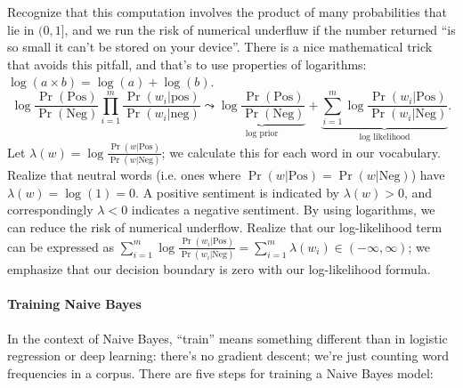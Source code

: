 \documentclass[12pt]{article}
\begin{document}
Recognize that this computation involves the product of many probabilities that lie in $(0,1]$, and we run the risk of numerical underfluw if the number returned ``is so small it can't be stored on your device''. There is a nice mathematical trick that avoids this pitfall, and that's to use properties of logarithms: $\log(a \times b) = \log (a) + \log (b)$.
\[
\log  \frac{\Pr(\textrm{Pos})}{\Pr(\textrm{Neg})} \prod_{i=1}^{m} \frac{\Pr(w_i | \textrm{pos})}{\Pr(w_i|\textrm{neg})}  \leadsto \underbrace{\log \frac{\Pr(\textrm{Pos})}{\Pr(\textrm{Neg})}}_{\textrm{log prior}} + \underbrace{\sum_{i=1}^{m} \log \frac{\Pr(w_i | \textrm{Pos})}{\Pr(w_i | \textrm{Neg})}}_{\textrm{log likelihood}}.
\]
Let $\lambda(w) = \log \frac{\Pr(w | \textrm{Pos})}{\Pr(w | \textrm{Neg})}$; we calculate this for each word in our vocabulary. Realize that neutral words (i.e. ones where $\Pr(w | \textrm{Pos}) = \Pr(w | \textrm{Neg})$) have $\lambda(w) = \log(1) = 0$. A positive sentiment is indicated by $\lambda(w) > 0$, and correspondingly $\lambda < 0$ indicates a negative sentiment. By using logarithms, we can reduce the risk of numerical underflow.
Realize that our log-likelihood term can be expressed as $\sum_{i=1}^{m} \log \frac{\Pr(w_i | \textrm{Pos})}{\Pr(w_i | \textrm{Neg})} = \sum_{i=1}^m \lambda(w_i) \in (-\infty, \infty)$; we emphasize that our decision boundary is zero with our log-likelihood formula.

\paragraph{Training Naive Bayes} In the context of Naive Bayes, ``train'' means something different than in logistic regression or deep learning: there's no gradient descent; we're just counting word frequencies in a corpus. There are five steps for training a Naive Bayes model:
\end{document}
